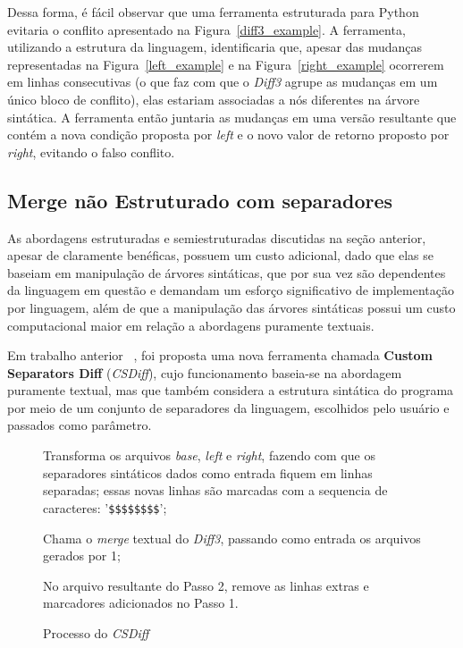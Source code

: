 Dessa forma, é fácil observar que uma ferramenta estruturada para Python evitaria o
conflito apresentado na Figura~\ref{diff3_example}. A ferramenta, utilizando a estrutura da
linguagem, identificaria que, apesar das mudanças representadas na Figura~\ref{left_example} e na
Figura~\ref{right_example} ocorrerem em linhas consecutivas (o que faz com que o \emph{Diff3}
agrupe as mudanças em um único bloco de conflito),
elas estariam associadas a nós diferentes na árvore
sintática. A ferramenta então juntaria as mudanças em uma versão resultante que contém a
nova condição proposta por \emph{left} e o novo valor de retorno proposto por \emph{right},
evitando o falso conflito.

\subsection{Merge não Estruturado com separadores}
As abordagens estruturadas e semiestruturadas discutidas na seção anterior, apesar de claramente benéficas,
possuem um custo adicional, dado que elas se baseiam em manipulação de árvores sintáticas, que por sua vez são
dependentes da linguagem em questão e demandam um esforço significativo de implementação por linguagem, além de que
a manipulação das árvores sintáticas possui um custo computacional maior em relação a abordagens puramente textuais.

Em trabalho anterior ~\cite{clem21}, foi proposta uma nova ferramenta chamada
\textbf{Custom Separators Diff} (\emph{CSDiff}), cujo funcionamento baseia-se na abordagem puramente textual, mas que também
considera a estrutura sintática do programa por meio de um conjunto de separadores da linguagem, escolhidos pelo usuário e
passados como parâmetro.

\begin{figure}[ht]
	\begin{center}
		\begin{compactenum}[(1)]
			\item Transforma os arquivos \emph{base}, \emph{left} e \emph{right}, fazendo com que os separadores sintáticos
			dados como entrada fiquem em linhas separadas; essas novas linhas são marcadas com a sequencia de caracteres:
			'\verb|$$$$$$$$|';
			\item Chama o \emph{merge} textual do \emph{Diff3}, passando como entrada os arquivos gerados por 1;
			\item No arquivo resultante do Passo 2, remove as linhas extras e marcadores adicionados no Passo 1.
		\end{compactenum}
	\end{center}
	\caption{Processo do \emph{CSDiff}}\label{csdiff_process}
\end{figure}


